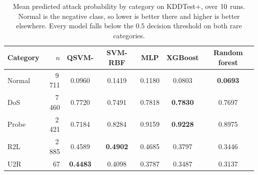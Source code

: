 \begin{table}[t]
\centering
\caption{Mean predicted attack probability by category on KDDTest+, over $10$ runs. Normal is the negative class, so lower is better there and higher is better elsewhere. Every model falls below the $0.5$ decision threshold on both rare categories.}
\label{tab:percat}
\begin{tabular}{lrccccc}
\toprule
Category & $n$ & QSVM-\ZZ{} & SVM-RBF & MLP & XGBoost & Random forest \\
\midrule
Normal & 9\,711 & 0.0960 & 0.1419 & 0.1180 & 0.0803 & \textbf{0.0693} \\
DoS & 7\,460 & 0.7720 & 0.7491 & 0.7818 & \textbf{0.7830} & 0.7697 \\
Probe & 2\,421 & 0.7184 & 0.8284 & 0.9159 & \textbf{0.9228} & 0.8975 \\
R2L & 2\,885 & 0.4589 & \textbf{0.4902} & 0.4685 & 0.3797 & 0.3446 \\
U2R & 67 & \textbf{0.4483} & 0.4098 & 0.3787 & 0.3487 & 0.3137 \\
\bottomrule
\end{tabular}
\end{table}
